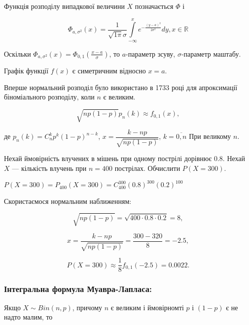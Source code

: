 Функція розподілу випадкової величини $X$ позначається $\Phi$ і

\begin{equation}
    \Phi_{a, \sigma^2}(x)
    = \frac{1}{\sqrt{1\pi} \sigma} \int\limits_{-\infty}^{x} e^{-\frac{(y-a)^2}{2\sigma^2}} dy,
    x \in \mathbb{R}
\end{equation}

Оскільки $\Phi_{a, \sigma^2}(x) = \Phi_{0, 1}(\frac{x-a}{\sigma})$,
то $a$-параметр зсуву, $\sigma$-параметр маштабу.

Графік функції $f(x)$ є симетричним відносно $x = a$.

\beautifulImage

Вперше нормальний розподіл було використано в 1733 році для
апроксимації біноміального розподілу, коли $n$ є великим.

\begin{theorem}
    \begin{equation}
        \sqrt{n p (1-p)} p_n(k) \approx f_{0, 1}(x),
    \end{equation}

    де $p_n(k) = C_n^kp^k(1-p)^{n-k}$,
    $x = \dfrac{k-np}{\sqrt{n p (1-p)}}$,
    $k = \overline{0, n}$
    При великому $n$.
\end{theorem}

\begin{example}
    Нехай ймовірність влучених в мішень при одному пострілі дорівнює 0.8.
    Нехай $X$ --- кількість влучень при $n = 400$ пострілах. Обчислити
    $P(X = 300)$.

    $P(X = 300)
    = P_{400}(X = 300)
    = C_{400}^{300} (0.8)^{300} (0.2)^{100}$
    
    Скористаємося нормальним наближенням:
    
    $$\sqrt{n p (1-p)} = \sqrt{400 \cdot 0.8 \cdot 0.2} = 8,$$
    
    $$x = \dfrac{k-np}{\sqrt{n p (1-p)}} = \dfrac{300-320}{8} = - 2.5,$$
    
    $$P(X = 300) \approx \frac{1}{8} f_{0,1}(-2.5) = 0.0022.$$
\end{example}
    
\subsubsection*{Інтегральна формула Муавра-Лапласа:}

Якщо $X \sim Bin(n, p)$, причому $n$ є великим і ймовірномті $p$
і $(1-p)$ є не надто малим, то

